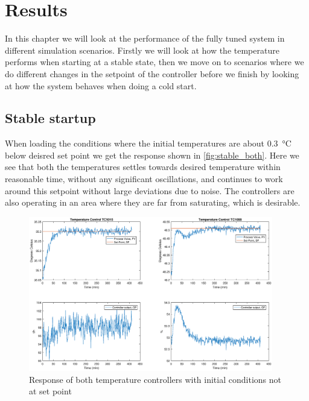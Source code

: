 \chapter{Results}
In this chapter we will look at the performance of the fully tuned system in different simulation scenarios. Firstly we will look at how the temperature performs when starting at a stable state, then we move on to scenarios where we do different changes in the setpoint of the controller before we finish by looking at how the system behaves when doing a cold start.

\section{Stable startup}
When loading the conditions where the initial temperatures are about \SI{0.3}{\degreeCelsius} below deisred set point we get the response shown in \autoref{fig:stable_both}. Here we see that both the temperatures settles towards desired temperature within reasonable time, without any significant oscillations, and continues to work around this setpoint without large deviations due to noise. The controllers are also operating in an area where they are far from saturating, which is desirable. 

\begin{figure}[ht!]
	\centering
	\includegraphics[width=0.95\textwidth]{fig/results/stable_both.eps}
	\caption{Response of both temperature controllers with initial conditions not at set point}
	\label{fig:stable_both}
\end{figure}

\clearpage

